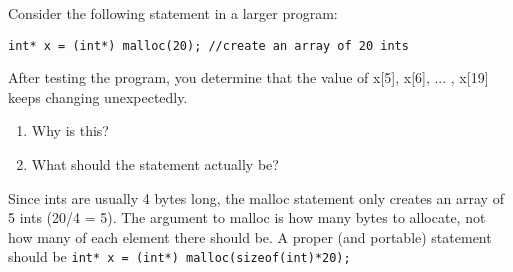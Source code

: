 Consider the following statement in a larger program:

\begin{lstlisting}
int* x = (int*) malloc(20); //create an array of 20 ints
\end{lstlisting}

After testing the program, you determine that the value of x[5], x[6], ... , x[19] keeps changing unexpectedly.
\begin{enumerate}
\item
Why is this?

\item
What should the statement actually be?

\end{enumerate}

\begin{answer}
Since ints are usually 4 bytes long, the malloc statement only creates an array of 5 ints (20/4 = 5).
The argument to malloc is how many bytes to allocate, not how many of each element there should be.
A proper (and portable) statement should be \texttt{int* x = (int*) malloc(sizeof(int)*20);}
\end{answer}
\newpage
